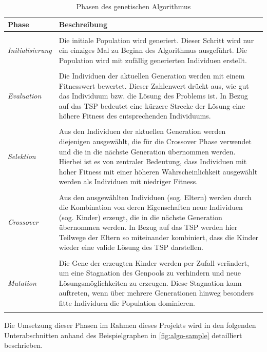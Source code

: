 \documentclass[12pt,a4paper]{scrreprt}
\begin{document}
\begin{center}
\begin{longtable}{p{3.0cm} p{10cm}}

Phase & Beschreibung \\
\hline \\
\textit{Initialisierung} & Die initiale Population wird generiert. Dieser Schritt wird nur ein einziges Mal zu Beginn des Algorithmus ausgeführt. Die Population wird mit zufällig generierten Individuen erstellt.\\
 & \\
\textit{Evaluation} &  Die Individuen der aktuellen Generation werden mit einem Fitnesswert bewertet. Dieser Zahlenwert drückt aus, wie gut das Individuum bzw. die Lösung des Problems ist. In Bezug auf das TSP bedeutet eine kürzere Strecke der Lösung eine höhere Fitness des entsprechenden Individuums.\\
 & \\
\textit{Selektion} & Aus den Individuen der aktuellen Generation werden diejenigen ausgewählt, die für die Crossover Phase verwendet und die in die nächste Generation übernommen werden. Hierbei ist es von zentraler Bedeutung, dass Individuen mit hoher Fitness mit einer höheren Wahrscheinlichkeit ausgewählt werden als Individuen mit niedriger Fitness.\\
 & \\
\textit{Crossover} & Aus den ausgewählten Individuen (sog. Eltern) werden durch die Kombination von deren Eigenschaften neue Individuen (sog. Kinder) erzeugt, die in die nächste Generation übernommen werden. In Bezug auf das TSP werden hier Teilwege der Eltern so miteinander kombiniert, dass die Kinder wieder eine valide Lösung des TSP darstellen.\\
 & \\
\textit{Mutation} & Die Gene der erzeugten Kinder werden per Zufall verändert, um eine Stagnation des Genpools zu verhindern und neue Lösungsmöglichkeiten zu erzeugen. Diese Stagnation kann auftreten, wenn über mehrere Generationen hinweg besonders fitte Individuen die Population dominieren.\\

\caption{Phasen des genetischen Algorithmus}
\label{tbl:phasen-algorithmus}
\end{longtable}
\end{center}

Die Umsetzung dieser Phasen im Rahmen dieses Projekts wird in den folgenden Unterabschnitten anhand des Beispielgraphen in \autoref{fig:algo-sample} detailliert beschrieben.
\end{document}
